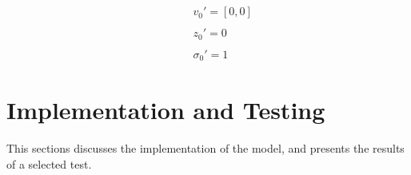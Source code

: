 \documentclass{acm_proc_article-sp}
\begin{document}
\begin{displaymath}
\begin{array}{l}
\\
\hspace{16pt} \hspace{16pt} v_0' = [0, 0] \\
\\
\hspace{16pt} \hspace{16pt} z_0' = 0 \\
\\
\hspace{16pt} \hspace{16pt} \sigma_0' = 1 
\end{array} \end{displaymath}

\section{Implementation and Testing} \label{Implementation}
This sections discusses the implementation of 
the model, and presents the results of a selected test.  
\end{document}
